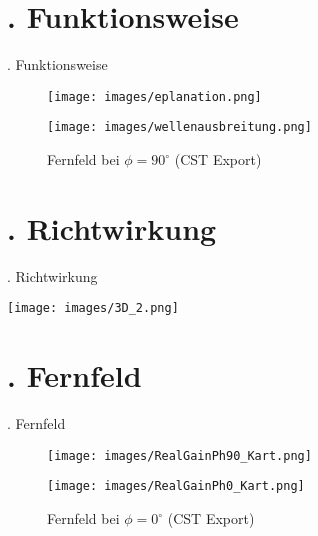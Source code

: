 \documentclass[
  aspectratio=169, %
]{beamer}
\begin{document}
\section{\thesection. Funktionsweise}
\begin{frame}{\thesection. Funktionsweise}
    \begin{figure}
        \centering
        \begin{minipage}[t]{0.49\textwidth}
            \centering
            \texttt{[image: images/eplanation.png]}
            \caption{Fernfeld bei $\phi = 0^\circ$ (CST Export)}
        \end{minipage}
                \hfill
        \begin{minipage}[t]{0.49\textwidth}
            \centering
            \texttt{[image: images/wellenausbreitung.png]}
            \caption{Fernfeld bei $\phi = 90^\circ$ (CST Export)}
        \end{minipage}
    \end{figure}
\end{frame}

\section{\thesection. Richtwirkung}
\begin{frame}{\thesection. Richtwirkung}
    \centering
    \begin{minipage}[t]{\textwidth}
        \texttt{[image: images/3D\_2.png]}
        \label{fig:richtwirkung}
    \end{minipage}
\end{frame}

\section{\thesection. Fernfeld}
\begin{frame}{\thesection. Fernfeld}
    \begin{figure}
        \centering
        \begin{minipage}[t]{0.49\textwidth}
            \centering
            \texttt{[image: images/RealGainPh90\_Kart.png]}
            \caption{Fernfeld bei $\phi = 90^\circ$ (CST Export)}
        \end{minipage}
        \hfill
        \begin{minipage}[t]{0.49\textwidth}
            \centering
            \texttt{[image: images/RealGainPh0\_Kart.png]}
            \caption{Fernfeld bei $\phi = 0^\circ$ (CST Export)}
        \end{minipage}
    \end{figure}
\end{frame}
\end{document}
